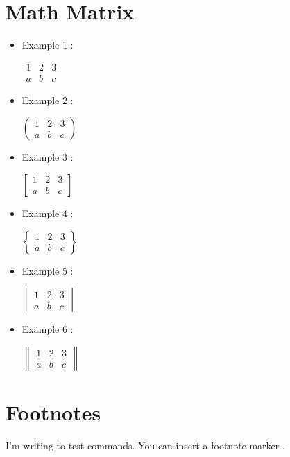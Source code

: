 \section{Math Matrix}
\begin{itemize}
  \item Example 1 :
        \par
        $\begin{matrix}
            1 & 2 & 3 \\
            a & b & c
          \end{matrix}$
        \par
  \item  Example 2 :
        \par
        $\begin{pmatrix}
            1 & 2 & 3 \\
            a & b & c
          \end{pmatrix}$
        \par
  \item  Example 3 :
        \par
        $\begin{bmatrix}
            1 & 2 & 3 \\
            a & b & c
          \end{bmatrix}$
        \par
  \item  Example 4 :
        \par
        $\begin{Bmatrix}
            1 & 2 & 3 \\
            a & b & c
          \end{Bmatrix}$
        \par
  \item  Example 5 :
        \par
        $\begin{vmatrix}
            1 & 2 & 3 \\
            a & b & c
          \end{vmatrix}$
        \par
  \item  Example 6 :
        \par
        $\begin{Vmatrix}
            1 & 2 & 3 \\
            a & b & c
          \end{Vmatrix}$
\end{itemize}

\section{Footnotes}

I'm writing to test commands.
You can insert a footnote marker \footnotemark{} . 